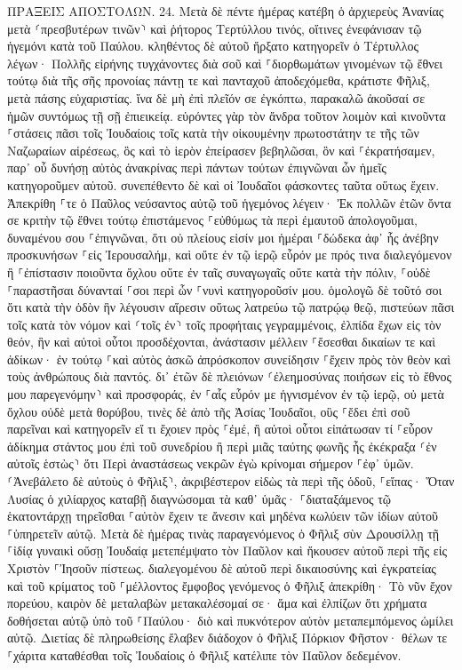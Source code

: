 \documentclass[twoside, 9pt]{extreport}
\begin{document}
ΠΡΑΞΕΙΣ ΑΠΟΣΤΟΛΩΝ.
24.
Μετὰ δὲ πέντε ἡμέρας κατέβη ὁ ἀρχιερεὺς Ἁνανίας μετὰ ⸂πρεσβυτέρων τινῶν⸃ καὶ ῥήτορος Τερτύλλου τινός, οἵτινες ἐνεφάνισαν τῷ ἡγεμόνι κατὰ τοῦ Παύλου. 
κληθέντος δὲ αὐτοῦ ἤρξατο κατηγορεῖν ὁ Τέρτυλλος λέγων· Πολλῆς εἰρήνης τυγχάνοντες διὰ σοῦ καὶ ⸀διορθωμάτων γινομένων τῷ ἔθνει τούτῳ διὰ τῆς σῆς προνοίας 
πάντῃ τε καὶ πανταχοῦ ἀποδεχόμεθα, κράτιστε Φῆλιξ, μετὰ πάσης εὐχαριστίας. 
ἵνα δὲ μὴ ἐπὶ πλεῖόν σε ἐγκόπτω, παρακαλῶ ἀκοῦσαί σε ἡμῶν συντόμως τῇ σῇ ἐπιεικείᾳ. 
εὑρόντες γὰρ τὸν ἄνδρα τοῦτον λοιμὸν καὶ κινοῦντα ⸀στάσεις πᾶσι τοῖς Ἰουδαίοις τοῖς κατὰ τὴν οἰκουμένην πρωτοστάτην τε τῆς τῶν Ναζωραίων αἱρέσεως, 
ὃς καὶ τὸ ἱερὸν ἐπείρασεν βεβηλῶσαι, ὃν καὶ ⸀ἐκρατήσαμεν, 
παρ᾽ οὗ δυνήσῃ αὐτὸς ἀνακρίνας περὶ πάντων τούτων ἐπιγνῶναι ὧν ἡμεῖς κατηγοροῦμεν αὐτοῦ. 
συνεπέθεντο δὲ καὶ οἱ Ἰουδαῖοι φάσκοντες ταῦτα οὕτως ἔχειν. 
Ἀπεκρίθη ⸀τε ὁ Παῦλος νεύσαντος αὐτῷ τοῦ ἡγεμόνος λέγειν· Ἐκ πολλῶν ἐτῶν ὄντα σε κριτὴν τῷ ἔθνει τούτῳ ἐπιστάμενος ⸀εὐθύμως τὰ περὶ ἐμαυτοῦ ἀπολογοῦμαι, 
δυναμένου σου ⸀ἐπιγνῶναι, ὅτι οὐ πλείους εἰσίν μοι ἡμέραι ⸀δώδεκα ἀφ᾽ ἧς ἀνέβην προσκυνήσων ⸀εἰς Ἰερουσαλήμ, 
καὶ οὔτε ἐν τῷ ἱερῷ εὗρόν με πρός τινα διαλεγόμενον ἢ ⸀ἐπίστασιν ποιοῦντα ὄχλου οὔτε ἐν ταῖς συναγωγαῖς οὔτε κατὰ τὴν πόλιν, 
⸀οὐδὲ ⸀παραστῆσαι δύνανταί ⸀σοι περὶ ὧν ⸀νυνὶ κατηγοροῦσίν μου. 
ὁμολογῶ δὲ τοῦτό σοι ὅτι κατὰ τὴν ὁδὸν ἣν λέγουσιν αἵρεσιν οὕτως λατρεύω τῷ πατρῴῳ θεῷ, πιστεύων πᾶσι τοῖς κατὰ τὸν νόμον καὶ ⸂τοῖς ἐν⸃ τοῖς προφήταις γεγραμμένοις, 
ἐλπίδα ἔχων εἰς τὸν θεόν, ἣν καὶ αὐτοὶ οὗτοι προσδέχονται, ἀνάστασιν μέλλειν ⸀ἔσεσθαι δικαίων τε καὶ ἀδίκων· 
ἐν τούτῳ ⸀καὶ αὐτὸς ἀσκῶ ἀπρόσκοπον συνείδησιν ⸀ἔχειν πρὸς τὸν θεὸν καὶ τοὺς ἀνθρώπους διὰ παντός. 
δι᾽ ἐτῶν δὲ πλειόνων ⸂ἐλεημοσύνας ποιήσων εἰς τὸ ἔθνος μου παρεγενόμην⸃ καὶ προσφοράς, 
ἐν ⸀αἷς εὗρόν με ἡγνισμένον ἐν τῷ ἱερῷ, οὐ μετὰ ὄχλου οὐδὲ μετὰ θορύβου, 
τινὲς δὲ ἀπὸ τῆς Ἀσίας Ἰουδαῖοι, οὓς ⸀ἔδει ἐπὶ σοῦ παρεῖναι καὶ κατηγορεῖν εἴ τι ἔχοιεν πρὸς ⸀ἐμέ, 
ἢ αὐτοὶ οὗτοι εἰπάτωσαν τί ⸀εὗρον ἀδίκημα στάντος μου ἐπὶ τοῦ συνεδρίου 
ἢ περὶ μιᾶς ταύτης φωνῆς ἧς ἐκέκραξα ⸂ἐν αὐτοῖς ἑστὼς⸃ ὅτι Περὶ ἀναστάσεως νεκρῶν ἐγὼ κρίνομαι σήμερον ⸀ἐφ᾽ ὑμῶν. 
⸂Ἀνεβάλετο δὲ αὐτοὺς ὁ Φῆλιξ⸃, ἀκριβέστερον εἰδὼς τὰ περὶ τῆς ὁδοῦ, ⸀εἴπας· Ὅταν Λυσίας ὁ χιλίαρχος καταβῇ διαγνώσομαι τὰ καθ᾽ ὑμᾶς· 
⸀διαταξάμενος τῷ ἑκατοντάρχῃ τηρεῖσθαι ⸀αὐτὸν ἔχειν τε ἄνεσιν καὶ μηδένα κωλύειν τῶν ἰδίων αὐτοῦ ⸀ὑπηρετεῖν αὐτῷ. 
Μετὰ δὲ ἡμέρας τινὰς παραγενόμενος ὁ Φῆλιξ σὺν Δρουσίλλῃ τῇ ⸀ἰδίᾳ γυναικὶ οὔσῃ Ἰουδαίᾳ μετεπέμψατο τὸν Παῦλον καὶ ἤκουσεν αὐτοῦ περὶ τῆς εἰς Χριστὸν ⸀Ἰησοῦν πίστεως. 
διαλεγομένου δὲ αὐτοῦ περὶ δικαιοσύνης καὶ ἐγκρατείας καὶ τοῦ κρίματος τοῦ ⸀μέλλοντος ἔμφοβος γενόμενος ὁ Φῆλιξ ἀπεκρίθη· Τὸ νῦν ἔχον πορεύου, καιρὸν δὲ μεταλαβὼν μετακαλέσομαί σε· 
ἅμα καὶ ἐλπίζων ὅτι χρήματα δοθήσεται αὐτῷ ὑπὸ τοῦ ⸀Παύλου· διὸ καὶ πυκνότερον αὐτὸν μεταπεμπόμενος ὡμίλει αὐτῷ. 
Διετίας δὲ πληρωθείσης ἔλαβεν διάδοχον ὁ Φῆλιξ Πόρκιον Φῆστον· θέλων τε ⸀χάριτα καταθέσθαι τοῖς Ἰουδαίοις ὁ Φῆλιξ κατέλιπε τὸν Παῦλον δεδεμένον. 
\end{document}
